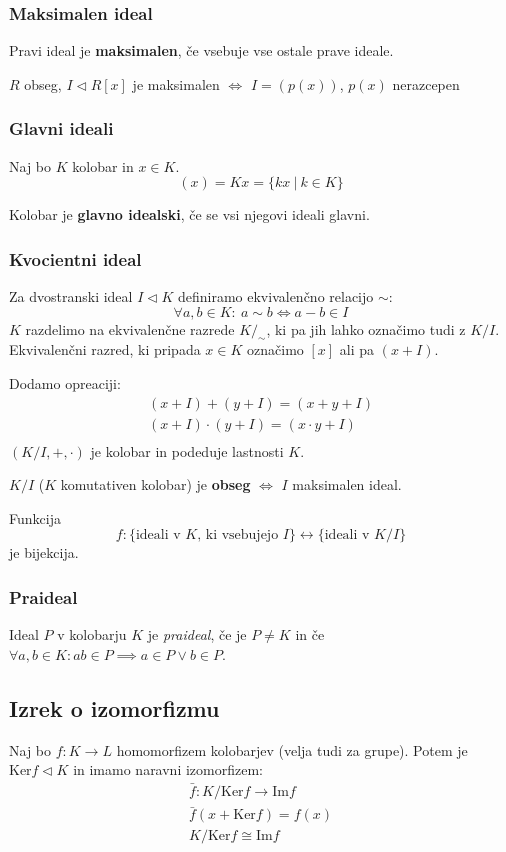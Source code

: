 \subsubsection*{Maksimalen ideal}
Pravi ideal je \textbf{maksimalen}, če vsebuje vse ostale prave ideale.

$R$ obseg, $I \lhd R[x]$ je maksimalen $\iff$ $I = (p(x))$, $p(x)$ nerazcepen

\subsubsection*{Glavni ideali}
Naj bo $K$ kolobar in $x \in K$.
\[ (x) = Kx = \{kx\ |\ k \in K\}\]

Kolobar je \textbf{glavno idealski}, če se vsi njegovi ideali glavni.

\subsubsection*{Kvocientni ideal}
Za dvostranski ideal $I \lhd K$ definiramo ekvivalenčno relacijo $\sim$:
\[ \forall a,b \in K:\ a \sim b \iff a-b \in I \]
$K$ razdelimo na ekvivalenčne razrede $K/_\sim$, ki pa jih lahko označimo tudi z $K/I$. Ekvivalenčni razred, ki pripada $x \in K$ označimo $[x]$ ali pa $(x+I)$.

Dodamo opreaciji:
\begin{align*}
	(x+I) + (y + I) = (x+y+I) \\
	(x+I) \cdot (y + I) = (x\cdot y+I) \\
\end{align*}
$(K/I, +, \cdot)$ je kolobar in podeduje lastnosti $K$.

$K/I$ ($K$ komutativen kolobar) je \textbf{obseg} $\iff$ $I$ maksimalen ideal.

Funkcija 
\[f: \{\text{ideali v $K$, ki vsebujejo $I$}\} \leftrightarrow \{\text{ideali v $K/I$}\}\] je bijekcija.

\subsubsection*{Praideal}
Ideal $P$ v kolobarju $K$ je \emph{praideal}, če je $P \neq K$ in če $\forall a,b \in K: ab \in P \implies a \in P \vee b \in P$.

\subsection*{Izrek o izomorfizmu}
Naj bo $f: K \to L$ homomorfizem kolobarjev (velja tudi za grupe). Potem je $\text{Ker}f \lhd K$ in imamo naravni izomorfizem:
\begin{align*}
	\bar{f}: K/\text{Ker}f \to \text{Im}f\\
	\bar{f} (x + \text{Ker}f) = f(x) \\
	K/\text{Ker}f \cong \text{Im}f
\end{align*}

